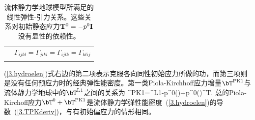{\begin{table}[!t]
\begin{tabular}{|l|l|}
& $\Gamma_{ijkl}=\Gamma_{jikl}=\Gamma_{ijlk}=\Gamma_{klij}$ \\
& \\ \hline
\end{tabular}
\caption[hydroeqn]{流体静力学地球模型所满足的线性弹性-引力关系。这些关系对初始静态应力${\bf T}^0=-p^0{\bf I}$没有显性的依赖性。}
\end{table}
(\ref{3.hydroelen})式右边的第二项表示克服各向同性初始应力所做的功，而第三项则是没有任何预应力时的经典弹性能密度。第一类Piola-Kirchhoff应力增量$\bT^{\rm PK1}$与流体静力学地球中的$\bT^{\rm L1}$之间的关系为
%
%
\eq
\label{3.hydroPKL}
\bT^{\rm PK1}=\bT^{\rm L1}-p^0(\bdel\cdot\bs)\bI+p^0(\bdel\bs)^{\rm T}.
\en
总的Piola-Kirchoff应力$\bT^0+\bT^{\rm PK1}$是流体静力学弹性能密度~(\ref{3.hydroelen})的导数~(\ref{3.TPKderiv})，与有初始偏应力的情形相同。

}
